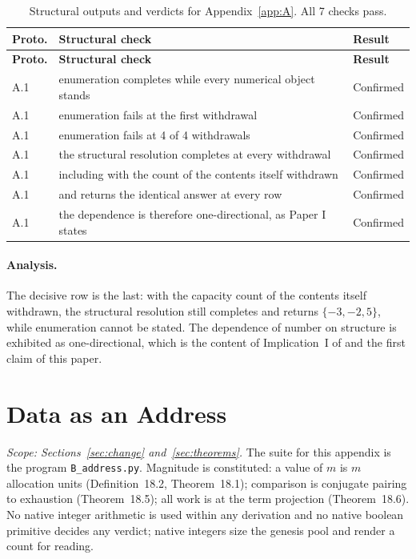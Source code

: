\documentclass[pdflatex,sn-mathphys-num]{sn-jnl}
\theoremstyle{thmstyleone}%
\theoremstyle{thmstyletwo}%
\theoremstyle{thmstylethree}%
\newcommand{\PA}{\cite{Swanagon2026PA}}
\begin{document}
\begin{appendices}
\begingroup\small\renewcommand{\arraystretch}{1.25}
\begin{longtable}{@{} p{} p{} p{} @{}}
\caption{Structural outputs and verdicts for Appendix~\ref{app:A}. All 7 checks pass.}\label{tab:appA_results}\\
\toprule
\textbf{Proto.} & \textbf{Structural check} & \textbf{Result} \\
\midrule
\endfirsthead
\toprule
\textbf{Proto.} & \textbf{Structural check} & \textbf{Result} \\
\midrule
\endhead
\bottomrule
\endfoot
A.1 & enumeration completes while every numerical object stands & Confirmed \\
A.1 & enumeration fails at the first withdrawal & Confirmed \\
A.1 & enumeration fails at 4 of 4 withdrawals & Confirmed \\
A.1 & the structural resolution completes at every withdrawal & Confirmed \\
A.1 & including with the count of the contents itself withdrawn & Confirmed \\
A.1 & and returns the identical answer at every row & Confirmed \\
A.1 & the dependence is therefore one-directional, as Paper I states & Confirmed \\
\end{longtable}\endgroup

\paragraph{Analysis.} The decisive row is the last: with the capacity count of the contents itself withdrawn, the structural resolution still completes and returns $\{-3,-2,5\}$, while enumeration cannot be stated. The dependence of number on structure is exhibited as one-directional, which is the content of Implication~I of \PA{} and the first claim of this paper.

\section{Data as an Address}\label{app:B}
\emph{Scope: Sections~\ref{sec:change} and~\ref{sec:theorems}.} The suite for this appendix is the program \texttt{B\_address.py}. Magnitude is constituted: a value of $m$ is $m$ allocation units (Definition~18.2, Theorem~18.1); comparison is conjugate pairing to exhaustion (Theorem~18.5); all work is at the term projection (Theorem~18.6). No native integer arithmetic is used within any derivation and no native boolean primitive decides any verdict; native integers size the genesis pool and render a count for reading.


\end{appendices}
\end{document}

